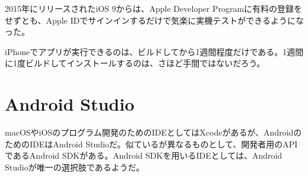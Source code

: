 \documentclass[uplatex,dvipdfmx]{jsarticle} \usepackage{amsmath,amssymb,bm}
\begin{document}
2015年にリリースされたiOS 9からは、Apple Developer Programに有料の登録をせずとも、Apple IDでサインインするだけで気楽に実機テストができるようになった。

iPhoneでアプリが実行できるのは、ビルドしてから1週間程度だけである。1週間に1度ビルドしてインストールするのは、さほど手間ではないだろう。

\section*{Android Studio}
macOSやiOSのプログラム開発のためのIDEとしてはXcodeがあるが、AndroidのためのIDEはAndroid Studioだ。似ているが異なるものとして、開発者用のAPIであるAndroid SDKがある。Android SDKを用いるIDEとしては、Android Studioが唯一の選択肢であるようだ。



\vspace{\baselineskip}
\begin{paracol}{2}
\switchcolumn
\end{paracol}
\end{document}
